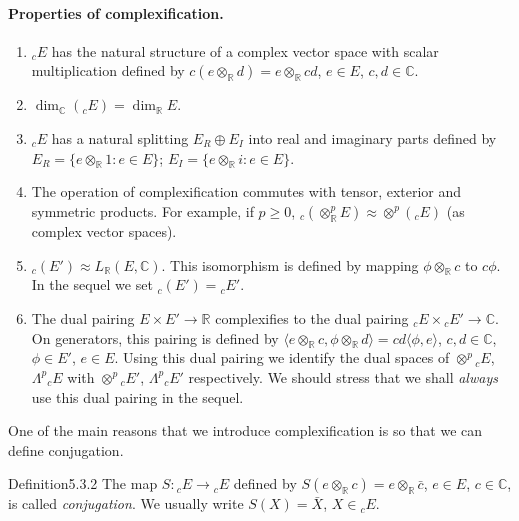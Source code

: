 \paragraph{Properties of complexification.}
\begin{enumerate}
\item ${}_cE$ has the natural structure of a complex vector space with scalar multiplication defined by $c(e\otimes_{\mathbb R}d)=e\otimes_{\mathbb R}cd$, $e\in E$, $c,d\in\mathbb C$.
\item $\dim_{\mathbb C}({}_cE)=\dim_{\mathbb R}E$.
\item ${}_cE$ has a natural splitting $E_R\oplus E_I$ into real and imaginary parts defined by $E_R=\{e\otimes_{\mathbb R}1:e\in E\}$; $E_I=\{e\otimes_{\mathbb R}i:e\in E\}$.
\item The operation of complexification commutes with tensor, exterior and symmetric products. For example, if $p\geq0$, ${}_c(\otimes_{\mathbb R}^p E)\approx\otimes^p({}_cE)$ (as complex vector spaces).
\item ${}_c(E')\approx L_{\mathbb R}(E,\mathbb C)$. This isomorphism is defined by mapping $\phi\otimes_{\mathbb R}c$ to $c\phi$. In the sequel we set ${}_c(E')={}_cE'$.
\item The dual pairing $E\times E'\to\mathbb R$ complexifies to the dual pairing ${}_cE\times{}_cE'\to\mathbb C$. On generators, this pairing is defined by $\langle e\otimes_{\mathbb R}c,\phi\otimes_{\mathbb R}d\rangle=cd\langle\phi,e\rangle$, $c,d\in\mathbb C$, $\phi\in E'$, $e\in E$. Using this dual
pairing we identify the dual spaces of $\otimes^p{}_cE$, $\Lambda^p{}_cE$ with $\otimes^p{}_cE'$, $\Lambda^p{}_cE'$ respectively. We should stress that we shall \emph{always} use this dual pairing in the sequel.
\end{enumerate}
One of the main reasons that we introduce complexification is so that we can define conjugation.
\begin{originaltheorem}{Definition}{5.3.2}
The map $S:{}_cE\to{}_cE$ defined by $S(e\otimes_{\mathbb R}c)=e\otimes_{\mathbb R}\bar c$, $e\in E$, $c\in\mathbb C$, is called \emph{conjugation}. We usually write $S(X)=\bar X$, $X\in{}_cE$.
\end{originaltheorem}
